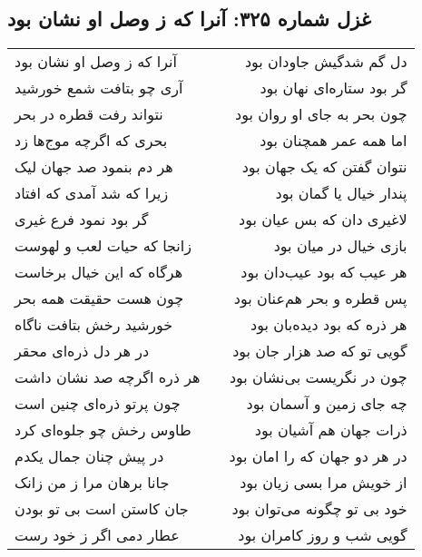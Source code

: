 \begin{center}
\section*{غزل شماره ۳۲۵: آنرا که ز وصل او نشان بود}
\label{sec:325}
\begin{longtable}{l p{0.5cm} r}
آنرا که ز وصل او نشان بود
&&
دل گم شدگیش جاودان بود
\\
آری چو بتافت شمع خورشید
&&
گر بود ستاره‌ای نهان بود
\\
نتواند رفت قطره در بحر
&&
چون بحر به جای او روان بود
\\
بحری که اگرچه موج‌ها زد
&&
اما همه عمر همچنان بود
\\
هر دم بنمود صد جهان لیک
&&
نتوان گفتن که یک جهان بود
\\
زیرا که شد آمدی که افتاد
&&
پندار خیال یا گمان بود
\\
گر بود نمود فرع غیری
&&
لاغیری دان که بس عیان بود
\\
زانجا که حیات لعب و لهوست
&&
بازی خیال در میان بود
\\
هرگاه که این خیال برخاست
&&
هر عیب که بود عیب‌دان بود
\\
چون هست حقیقت همه بحر
&&
پس قطره و بحر هم‌عنان بود
\\
خورشید رخش بتافت ناگاه
&&
هر ذره که بود دیده‌بان بود
\\
در هر دل ذره‌ای محقر
&&
گویی تو که صد هزار جان بود
\\
هر ذره اگرچه صد نشان داشت
&&
چون در نگریست بی‌نشان بود
\\
چون پرتو ذره‌ای چنین است
&&
چه جای زمین و آسمان بود
\\
طاوس رخش چو جلوه‌ای کرد
&&
ذرات جهان هم آشیان بود
\\
در پیش چنان جمال یکدم
&&
در هر دو جهان که را امان بود
\\
جانا برهان مرا ز من زانک
&&
از خویش مرا بسی زیان بود
\\
جان کاستن است بی تو بودن
&&
خود بی تو چگونه می‌توان بود
\\
عطار دمی اگر ز خود رست
&&
گویی شب و روز کامران بود
\\
\end{longtable}
\end{center}
